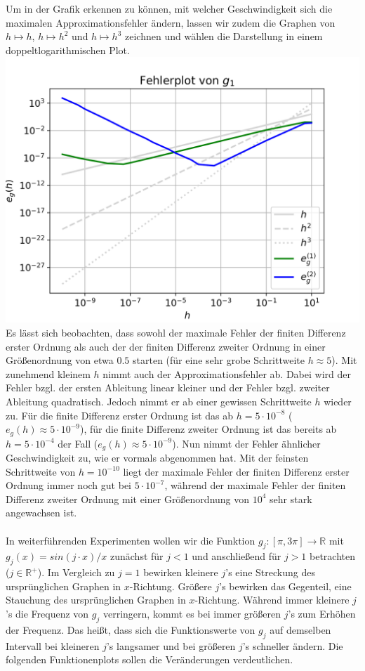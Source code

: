 \documentclass{scrartcl}
\begin{document}
Um in der Grafik erkennen zu können, mit welcher Geschwindigkeit sich die maximalen Approximationsfehler ändern, lassen wir zudem die Graphen von $h \mapsto h$, $h \mapsto h^{2}$ und $h \mapsto h^{3}$ zeichnen und wählen die Darstellung in einem doppeltlogarithmischen Plot. \\
\includegraphics{Grafiken/Fehlerplot_Aufgabe2}\\
Es lässt sich beobachten, dass sowohl der maximale Fehler der finiten Differenz erster Ordnung als auch der der finiten Differenz zweiter Ordnung in einer Größenordnung von etwa $0.5$ starten (für eine sehr grobe Schrittweite $h \approx 5$). Mit zunehmend kleinem $h$ nimmt auch der Approximationsfehler ab. Dabei wird der Fehler bzgl. der ersten Ableitung linear kleiner und der Fehler bzgl. zweiter Ableitung quadratisch. Jedoch nimmt er ab einer gewissen Schrittweite $h$ wieder zu. Für die finite Differenz erster Ordnung ist das ab $h = 5\cdot10^{-8}$ ($e_g(h) \approx  5 \cdot 10^{-9}$), für die finite Differenz zweiter Ordnung ist das bereits ab $h = 5 \cdot 10^{-4}$ der Fall ($e_g(h) \approx  5 \cdot 10^{-9}$). Nun nimmt der Fehler ähnlicher Geschwindigkeit zu, wie er vormals abgenommen hat. Mit der feinsten Schrittweite von $h = 10^{-10}$ liegt der maximale Fehler der finiten Differenz erster Ordnung immer noch gut bei $5 \cdot 10^{-7}$, während der maximale Fehler der finiten Differenz zweiter Ordnung mit einer Größenordnung von $10^{4}$ sehr stark angewachsen ist.
\\
 \\
In weiterführenden Experimenten wollen wir die Funktion $g_j:[\pi, 3\pi] \rightarrow \mathbb{R}$ mit $g_j(x) = sin(j\cdot x)/x$ zunächst für $j<1$ und anschließend für $j>1$ betrachten ($j \in \mathbb{R^{+}}$). Im Vergleich zu $j = 1$ bewirken kleinere $j$'s eine Streckung des ursprünglichen Graphen in $x$-Richtung. Größere $j$'s bewirken das Gegenteil, eine Stauchung des ursprünglichen Graphen in $x$-Richtung. Während immer kleinere $j$'s die Frequenz von $g_j$ verringern, kommt es bei immer größeren $j$'s zum Erhöhen der Frequenz. Das heißt, dass sich die Funktionswerte von $g_j$ auf demselben Intervall bei kleineren $j$'s langsamer und bei größeren $j$'s schneller ändern. Die folgenden Funktionenplots sollen die Veränderungen verdeutlichen. \\
\end{document}
